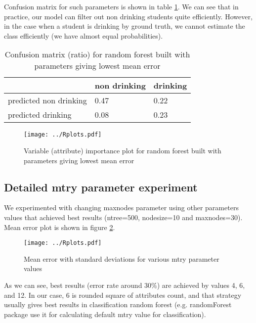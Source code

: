 \documentclass[a4paper]{article}
\begin{document}
Confusion matrix for such parameters is shown in table \ref{table:convMx}.
We can see that in practice, our model can filter out non drinking students
quite efficiently.
However, in the case when a student is drinking by ground truth, we cannot
estimate the class efficiently (we have almost equal probabilities).

\begin{table}[!hbt]
    \caption{Confusion matrix (ratio) for random forest built with parameters giving lowest mean error
    \label{table:convMx}
    }
\begin{center}
    \begin{tabular}{| l | l | l |}
    \hline
        & non drinking & drinking \\
    \hline
        predicted non drinking  & 0.47 & 0.22 \\
        predicted drinking  &  0.08 & 0.23 \\
    \hline
    \end{tabular}
\end{center}
\end{table}


\begin{figure}[!hbt]
    \centering
    \texttt{[image: ../Rplots.pdf]}
    \caption[]{Variable (attribute) importance plot for random forest built with parameters giving lowest mean error
    \label{fig:importance}
    }
\end{figure}

\subsection{Detailed mtry parameter experiment}
\label{mtryExp}

We experimented with changing maxnodes parameter using other parameters values
that achieved best results (ntree=500, nodesize=10 and maxnodes=30).
Mean error plot is shown in figure \ref{fig:detailedMtry}.

\begin{figure}[!hbt]
    \centering
    \texttt{[image: ../Rplots.pdf]}
    \caption[]{Mean error with standard deviations for various mtry parameter values
    \label{fig:detailedMtry}
    }
\end{figure}

As we can see, best results (error rate around 30\%) are achieved by values 4, 6, and 12.
In our case, 6 is rounded square of attributes count, and that strategy usually
gives best results in classification random forest
(e.g. randomForest package use it for calculating default mtry value for classification).
\end{document}
